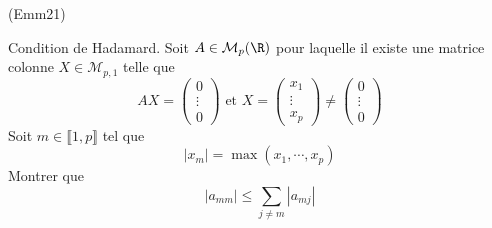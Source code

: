 \begin{tiny}(Emm21)\end{tiny} Condition de Hadamard.\newline
Soit $A\in \mathcal{M}_{p}(\R)$ pour laquelle il existe une matrice colonne $X\in \mathcal{M}_{p,1}$ telle que 
\begin{displaymath}
  AX = 
\begin{pmatrix}
  0\\ \vdots \\0
\end{pmatrix}
\text{ et }
X =
\begin{pmatrix}
  x_1\\ \vdots \\x_p
\end{pmatrix}
\neq
\begin{pmatrix}
  0\\ \vdots \\0
\end{pmatrix}
\end{displaymath}
Soit $m\in \llbracket 1,p\rrbracket$ tel que 
\begin{displaymath}
  |x_m| = \max(x_1,\cdots,x_p)
\end{displaymath}
Montrer que 
\begin{displaymath}
  |a_{mm}| \leq \sum_{j\neq m} |a_{mj}|
\end{displaymath}
